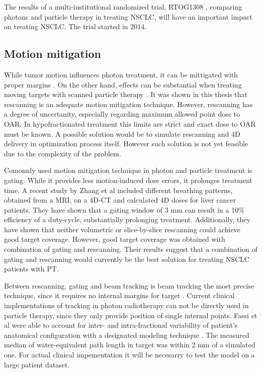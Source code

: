 \documentclass[type=dr, dr=rernat, accentcolor=tud7b,colorbacktitle, bigchapter, openright, twoside, 12pt ]{tudthesis}
\begin{document}
The results of a multi-institutional randomized trial, RTOG1308 \cite{RTOG1308}, comparing photons and particle therapy in treating NSCLC,
will have an important impact on treating NSCLC. The trial started in 2014.

\subsection{Motion mitigation}

While tumor motion influences photon treatment, it can be mittigated with proper margins \cite{Zou2014}. 
On the other hand, effects can be substantial when treating moving targets with scanned particle therapy \cite{Bert2008}.
It was shown in this thesis that rescanning is an adequate motion mitigation technique. However, rescanning has a degree of uncertanity, 
especially regarding maximum allowed point dose to OAR.
In hypofractionated treatment this limits are strict and exact dose to OAR must be known. 
A possible solution would be to simulate rescanning and 4D delivery in optimization process itself. 
However such solution is not yet feasible due to the complexity of the problem.

Comonnly used motion mitigation technique in photon and particle treatment is gating. While it provides less motion-induced dose errors, it prolonges treatment time.
A recent study by Zhang et al \cite{Zhang2015} included 
different breathing patterns, obtained from a MRI, on a 4D-CT and calculated 4D doses for liver cancer patients. They have shown that a gating window of 3 mm can result
in a 10\% efficiency of a duty-cycle, 
substantially prolonging treatment. Additionally, they have shown that neither volumetric or slice-by-slice rescanning could achieve good target coverage.
However, good target coverage was obtained with combination
of gating and rescanning. Their results suggest that a combination of gating and rescanning would currently be the best solution for treating NSCLC patients with PT.

Between rescanning, gating and beam tracking is beam tracking the most precise technique, since it requires no internal margins for target \cite{Bert2011}. 
Current clinical implementations of tracking in photon radiotherapy \cite{Kilby2010, Keall2014} can not be directly used in particle therapy, 
since they only provide position of single internal points. Fassi et al 
\cite{Fassi2015} were able to account for inter- and intra-fractional variability of patient's anatomical configuration with a designated modeling technique \cite{Fassi2014}.
The measured median of water-equivalent path length in target was within 2 mm of a simulated one. For actual clinical impementation it will be necesarry to test the model
on a large patient dataset.
\end{document}
